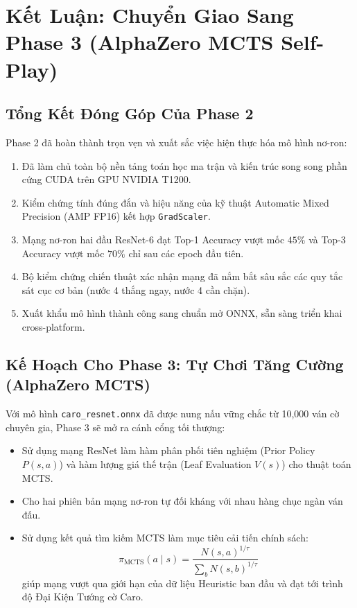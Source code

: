 \documentclass[11pt,a4paper]{report}
\begin{document}
\chapter{Kết Luận: Chuyển Giao Sang Phase 3 (AlphaZero MCTS Self-Play)}

\section{Tổng Kết Đóng Góp Của Phase 2}

Phase 2 đã hoàn thành trọn vẹn và xuất sắc việc hiện thực hóa mô hình nơ-ron:
\begin{enumerate}
    \item Đã làm chủ toàn bộ nền tảng toán học ma trận và kiến trúc song song phần cứng CUDA trên GPU NVIDIA T1200.
    \item Kiểm chứng tính đúng đắn và hiệu năng của kỹ thuật Automatic Mixed Precision (AMP FP16) kết hợp \texttt{GradScaler}.
    \item Mạng nơ-ron hai đầu ResNet-6 đạt Top-1 Accuracy vượt mốc $45\%$ và Top-3 Accuracy vượt mốc $70\%$ chỉ sau các epoch đầu tiên.
    \item Bộ kiểm chứng chiến thuật xác nhận mạng đã nắm bắt sâu sắc các quy tắc sát cục cơ bản (nước 4 thắng ngay, nước 4 cần chặn).
    \item Xuất khẩu mô hình thành công sang chuẩn mở ONNX, sẵn sàng triển khai cross-platform.
\end{enumerate}

\section{Kế Hoạch Cho Phase 3: Tự Chơi Tăng Cường (AlphaZero MCTS)}

Với mô hình \texttt{caro\_resnet.onnx} đã được nung nấu vững chắc từ 10,000 ván cờ chuyên gia, Phase 3 sẽ mở ra cánh cổng tối thượng:
\begin{itemize}
    \item Sử dụng mạng ResNet làm hàm phân phối tiên nghiệm (Prior Policy $P(s, a)$) và hàm lượng giá thế trận (Leaf Evaluation $V(s)$) cho thuật toán MCTS.
    \item Cho hai phiên bản mạng nơ-ron tự đối kháng với nhau hàng chục ngàn ván đấu.
    \item Sử dụng kết quả tìm kiếm MCTS làm mục tiêu cải tiến chính sách:
    \begin{equation}
        \pi_{\text{MCTS}}(a \mid s) = \frac{N(s, a)^{1/\tau}}{\sum_b N(s, b)^{1/\tau}}
    \end{equation}
    giúp mạng vượt qua giới hạn của dữ liệu Heuristic ban đầu và đạt tới trình độ Đại Kiện Tướng cờ Caro.
\end{itemize}
\end{document}
